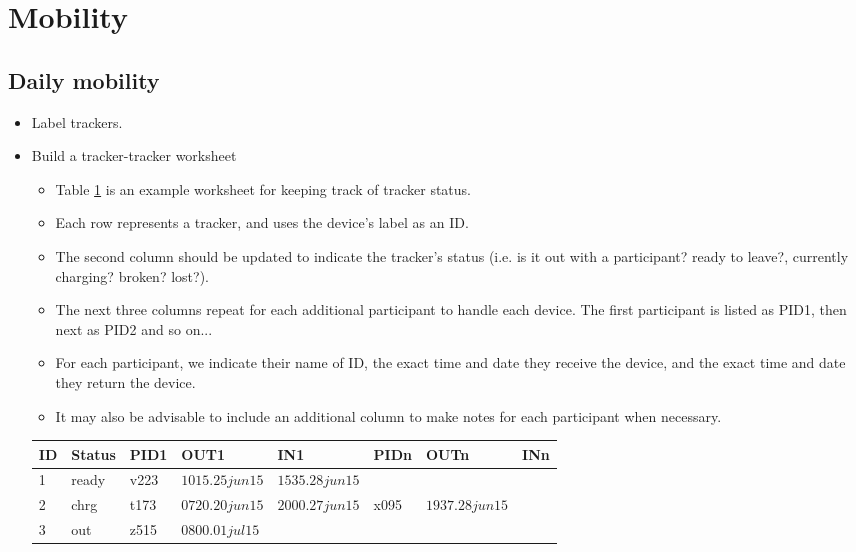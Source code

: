 \documentclass{article}
\begin{document}
\section{Mobility}

\subsection{Daily mobility}

\begin{itemize}

\item Label trackers.

\item Build a tracker-tracker worksheet

	\begin{itemize}
	\item Table \ref{tab:tracktrack} is an example worksheet for keeping track of tracker status.
	\item Each row represents a tracker, and uses the device's label as an ID.
	\item The second column should be updated to indicate the tracker's status (i.e. is it out with a participant? ready to leave?, currently charging? broken? lost?).
	\item The next three columns repeat for each additional participant to handle each device.  The first participant is listed as PID1, then next as PID2 and so on...
	\item For each participant, we indicate their name of ID, the exact time and date they receive the device, and the exact time and date they return the device.
	\item It may also be advisable to include an additional column to make notes for each participant when necessary.
	\end{itemize}

\begin{table}[H]
\begin{tabular}{l l l l l l l l}
\toprule
\textbf{ID} & \textbf{Status} & \textbf{PID1}  & \textbf{OUT1}  & \textbf{IN1} & \textbf{PIDn}  & \textbf{OUTn}  & \textbf{INn}\\
\toprule
1 & ready & v223 & $1015.25jun15$ & $1535.28jun15$ & & & \\
2 & chrg & t173 & $0720.20jun15$ & $2000.27jun15$ & x095 & $1937.28jun15$ & \\
3 & out & z515 & $0800.01jul15$ & & & \\
\bottomrule
\end{tabular}
\label{tab:tracktrack}
\end{table}


\end{itemize}
\end{document}
